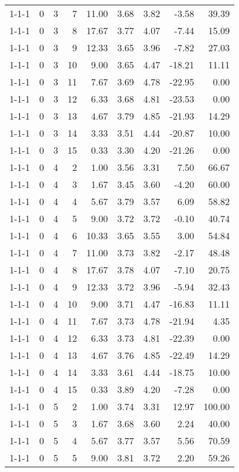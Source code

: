 \begin{tabular}{lrrrrrrrr}
1-1-1 & 0 & 3 & 7 & 11.00 & 3.68 & 3.82 & -3.58 & 39.39 \\
1-1-1 & 0 & 3 & 8 & 17.67 & 3.77 & 4.07 & -7.44 & 15.09 \\
1-1-1 & 0 & 3 & 9 & 12.33 & 3.65 & 3.96 & -7.82 & 27.03 \\
1-1-1 & 0 & 3 & 10 & 9.00 & 3.65 & 4.47 & -18.21 & 11.11 \\
1-1-1 & 0 & 3 & 11 & 7.67 & 3.69 & 4.78 & -22.95 & 0.00 \\
1-1-1 & 0 & 3 & 12 & 6.33 & 3.68 & 4.81 & -23.53 & 0.00 \\
1-1-1 & 0 & 3 & 13 & 4.67 & 3.79 & 4.85 & -21.93 & 14.29 \\
1-1-1 & 0 & 3 & 14 & 3.33 & 3.51 & 4.44 & -20.87 & 10.00 \\
1-1-1 & 0 & 3 & 15 & 0.33 & 3.30 & 4.20 & -21.26 & 0.00 \\
1-1-1 & 0 & 4 & 2 & 1.00 & 3.56 & 3.31 & 7.50 & 66.67 \\
1-1-1 & 0 & 4 & 3 & 1.67 & 3.45 & 3.60 & -4.20 & 60.00 \\
1-1-1 & 0 & 4 & 4 & 5.67 & 3.79 & 3.57 & 6.09 & 58.82 \\
1-1-1 & 0 & 4 & 5 & 9.00 & 3.72 & 3.72 & -0.10 & 40.74 \\
1-1-1 & 0 & 4 & 6 & 10.33 & 3.65 & 3.55 & 3.00 & 54.84 \\
1-1-1 & 0 & 4 & 7 & 11.00 & 3.73 & 3.82 & -2.17 & 48.48 \\
1-1-1 & 0 & 4 & 8 & 17.67 & 3.78 & 4.07 & -7.10 & 20.75 \\
1-1-1 & 0 & 4 & 9 & 12.33 & 3.72 & 3.96 & -5.94 & 32.43 \\
1-1-1 & 0 & 4 & 10 & 9.00 & 3.71 & 4.47 & -16.83 & 11.11 \\
1-1-1 & 0 & 4 & 11 & 7.67 & 3.73 & 4.78 & -21.94 & 4.35 \\
1-1-1 & 0 & 4 & 12 & 6.33 & 3.73 & 4.81 & -22.39 & 0.00 \\
1-1-1 & 0 & 4 & 13 & 4.67 & 3.76 & 4.85 & -22.49 & 14.29 \\
1-1-1 & 0 & 4 & 14 & 3.33 & 3.61 & 4.44 & -18.75 & 10.00 \\
1-1-1 & 0 & 4 & 15 & 0.33 & 3.89 & 4.20 & -7.28 & 0.00 \\
1-1-1 & 0 & 5 & 2 & 1.00 & 3.74 & 3.31 & 12.97 & 100.00 \\
1-1-1 & 0 & 5 & 3 & 1.67 & 3.68 & 3.60 & 2.24 & 40.00 \\
1-1-1 & 0 & 5 & 4 & 5.67 & 3.77 & 3.57 & 5.56 & 70.59 \\
1-1-1 & 0 & 5 & 5 & 9.00 & 3.81 & 3.72 & 2.20 & 59.26 \\

\end{tabular}
